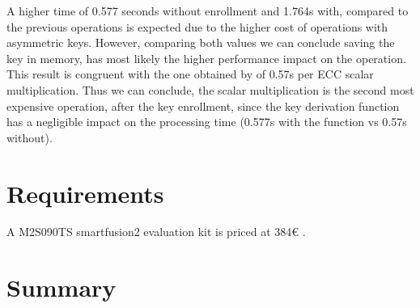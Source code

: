 A higher time of 0.577 seconds without enrollment and 1.764s with, compared to the previous operations is expected due to the higher cost of operations with asymmetric keys.
However, comparing both values we can conclude saving the key in memory, has most likely the higher performance impact on the operation.
This result is congruent with the one obtained by \cite{parrinha2017flexible} of 0.57s per ECC scalar multiplication.
Thus we can conclude, the scalar multiplication is the second most expensive operation, after the key enrollment, since the key derivation function has a negligible impact on the processing time (0.577s with the function vs 0.57s without).

\section{Requirements}\label{chap:evaluation:requirements}

A M2S090TS smartfusion2 evaluation kit is priced at 384€ \cite{smartfusionPrice}.



\section{Summary}\label{chap:evaluation:summary}
